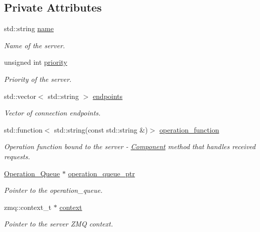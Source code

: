 \subsection*{Private Attributes}
\begin{DoxyCompactItemize}
\item 
std\+::string \hyperlink{classzcm_1_1Server_a9d59737b196a7abb3a891dc8723e0dcf}{name}
\begin{DoxyCompactList}\small\item\em Name of the server. \end{DoxyCompactList}\item 
unsigned int \hyperlink{classzcm_1_1Server_ad088a068dc025ff7aa4bf560cc7c43c1}{priority}
\begin{DoxyCompactList}\small\item\em Priority of the server. \end{DoxyCompactList}\item 
std\+::vector$<$ std\+::string $>$ \hyperlink{classzcm_1_1Server_a488d1398b76851565a4d116f7cf72af1}{endpoints}
\begin{DoxyCompactList}\small\item\em Vector of connection endpoints. \end{DoxyCompactList}\item 
std\+::function$<$ std\+::string(const std\+::string \&)$>$ \hyperlink{classzcm_1_1Server_a287609eb19370fe01adf47f26633ce01}{operation\+\_\+function}
\begin{DoxyCompactList}\small\item\em Operation function bound to the server -\/ \hyperlink{classzcm_1_1Component}{Component} method that handles received requests. \end{DoxyCompactList}\item 
\hyperlink{classzcm_1_1Operation__Queue}{Operation\+\_\+\+Queue} $\ast$ \hyperlink{classzcm_1_1Server_a667c0fef537aa6acc6245d956250c860}{operation\+\_\+queue\+\_\+ptr}
\begin{DoxyCompactList}\small\item\em Pointer to the operation\+\_\+queue. \end{DoxyCompactList}\item 
zmq\+::context\+\_\+t $\ast$ \hyperlink{classzcm_1_1Server_a2de8909537ebb88665bfcca1f931c2f8}{context}
\begin{DoxyCompactList}\small\item\em Pointer to the server Z\+MQ context. \end{DoxyCompactList}\item 

\end{DoxyCompactItemize}
